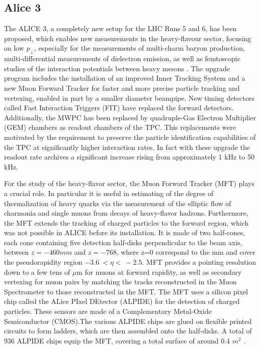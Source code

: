 \documentclass[12pt,a4paper]{book}
\begin{document}
	\subsection{Alice 3}
	 The ALICE 3, a completely new setup for the LHC Runs 5 and 6, has been proposed, which enables new measurements in the heavy-flavour sector, focusing on low $p_\perp$, especially for the measurements of multi-charm baryon production, multi-differential measurements of dielectron emission, as well as femtoscopic studies of the interaction potentials between heavy mesons \cite{Cheng:2908766}. The upgrade program includes the installation of an improved Inner Tracking System and a new Muon Forward Tracker for faster and more precise particle tracking and vertexing, enabled in part by a smaller diameter beampipe. New timing detectors called Fast Interaction Triggers (FIT) have replaced the forward detectors. Additionally, the MWPC has been replaced by quadruple-Gas Electron Multiplier (GEM) chambers as readout chambers of the TPC. This replacements were motivated by the requirement to preserve the particle identification capabilities of the TPC at significantly higher interaction rates. In fact with these upgrade the readout rate archives a significant increase rising from approximately 1 kHz to 50 kHz. 
	
	For the study of the heavy-flavor sector, the Muon Forward Tracker (MFT) plays a crucial role. In particular it is useful in estimating of the degree of thermalization of heavy quarks via the measurement of the elliptic flow of charmonia and single muons from decays of heavy-flavor hadrons. Furthermore, the MFT extends the tracking of charged particles to the forward region, which was not possible in ALICE before its installation. It is made of two half-cones, each cone containing five detection half-disks perpendicular to the beam axis, between $z = -460 mm$ and $z = -768$, where z=0 correspond to the  mm and cover the pseudorapidity region $-3.6 \ < \eta < \ -2.5$. MFT provides a pointing resolution down to a few tens of $\mu$m for muons at forward rapidity, as well as secondary vertexing for muon pairs by matching the tracks reconstructed in the Muon Spectrometer to those reconstructed in the MFT. The MFT uses a silicon pixel chip called the ALice PIxel DEtector (ALPIDE) for the detection of charged particles. These sensors are made of a Complementary Metal-Oxide Semiconductor (CMOS).The various ALPIDE chips are glued on flexible printed circuits to form ladders, which are then assembled onto the half-disks. A total of 936 ALPIDE chips equip the MFT, covering a total surface of around 0.4 $m^2$ \cite{Herrmann:2920632}.
	
\end{document}
